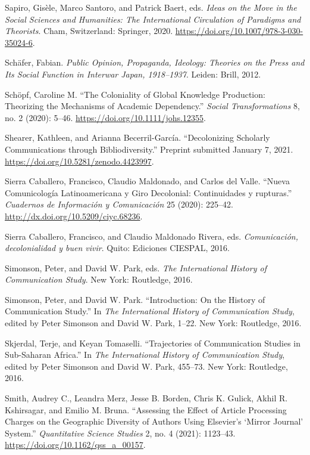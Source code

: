 \documentclass{tufte-handout}
\begin{document}
\begin{hangparas}{.25in}{1}
Sapiro, Gisèle, Marco Santoro, and Patrick Baert, eds. \emph{Ideas on
the Move in the Social Sciences and Humanities: The International
Circulation of Paradigms and Theorists}. Cham, Switzerland: Springer,
2020. \url{https://doi.org/10.1007/978-3-030-35024-6}.

Schäfer, Fabian. \emph{Public Opinion, Propaganda, Ideology: Theories on
the Press and Its Social Function in Interwar Japan, 1918--1937}.
Leiden: Brill, 2012.

Schöpf, Caroline M. ``The Coloniality of Global Knowledge Production:
Theorizing the Mechanisms of Academic Dependency.'' \emph{Social
Transformations} 8, no. 2 (2020): 5--46.
\url{https://doi.org/10.1111/johs.12355}.

Shearer, Kathleen, and Arianna Becerril-García. ``Decolonizing Scholarly
Communications through Bibliodiversity.'' Preprint submitted January 7,
2021. \url{https://doi.org/10.5281/zenodo.4423997}.

Sierra Caballero, Francisco, Claudio Maldonado, and Carlos del Valle.
``Nueva Comunicología Latinoamericana y Giro Decolonial: Continuidades y
rupturas.'' \emph{Cuadernos de Información y Comunicación} 25 (2020):
225--42. \url{http://dx.doi.org/10.5209/ciyc.68236}.

Sierra Caballero, Francisco, and Claudio Maldonado Rivera, eds.
\emph{Comunicación, decolonialidad y buen vivir}. Quito: Ediciones
CIESPAL, 2016.

Simonson, Peter, and David W. Park, eds. \emph{The International History
of Communication Study}. New York: Routledge, 2016.

Simonson, Peter, and David W. Park. ``Introduction: On the History of
Communication Study.'' In \emph{The International History of
Communication Study}, edited by Peter Simonson and David W. Park, 1--22.
New York: Routledge, 2016.

Skjerdal, Terje, and Keyan Tomaselli. ``Trajectories of Communication
Studies in Sub-Saharan Africa.'' In \emph{The International History of
Communication Study}, edited by Peter Simonson and David W. Park,
455--73. New York: Routledge, 2016.

Smith, Audrey C., Leandra Merz, Jesse B. Borden, Chris K. Gulick, Akhil
R. Kshirsagar, and Emilio M. Bruna. ``Assessing the Effect of Article
Processing Charges on the Geographic Diversity of Authors Using
Elsevier's `Mirror Journal' System.'' \emph{Quantitative Science
Studies} 2, no. 4 (2021): 1123--43.
\url{https://doi.org/10.1162/qss_a_00157}.


\end{hangparas}
\end{document}

